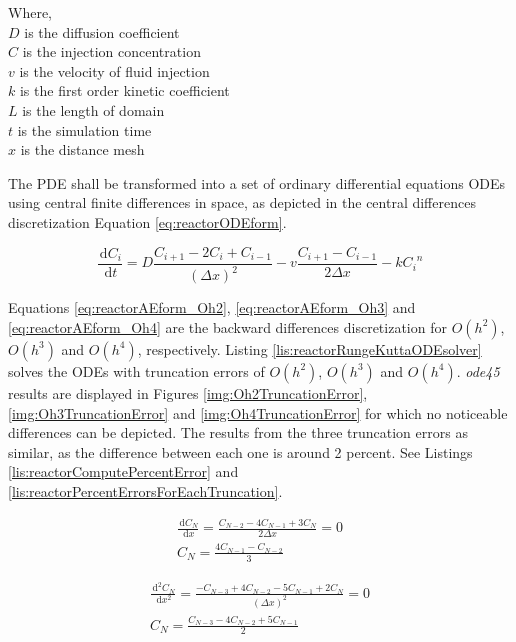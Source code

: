 \documentclass{article}
\newcommand{\ud}{\,\mathrm{d}}
\begin{document}
Where, \\
$D$ is the diffusion coefficient \\
$C$ is the injection concentration \\
$v$ is the velocity of fluid injection \\
$k$ is the first order kinetic coefficient \\
$L$ is the length of domain \\
$t$ is the simulation time \\
$x$ is the distance mesh

The PDE shall be transformed into a set of ordinary differential equations ODEs using central finite differences in space, as depicted in the central differences discretization Equation \ref{eq:reactorODEform}.

\begin{equation}
\frac{\ud C_i}{\ud t} = D \frac{C_{i+1} - 2 C_i + C_{i-1}}{\left( \Delta x \right)^2} - v \frac{C_{i+1} - C_{i-1}}{2 \Delta x} - k {C_i}^n
\label{eq:reactorODEform}
\end{equation}

Equations \ref{eq:reactorAEform_Oh2}, \ref{eq:reactorAEform_Oh3} and \ref{eq:reactorAEform_Oh4} are the backward differences discretization for $O(h^2)$, $O(h^3)$ and $O(h^4)$, respectively. Listing \ref{lis:reactorRungeKuttaODEsolver} solves the ODEs with truncation errors of $O(h^2)$, $O(h^3)$ and $O(h^4)$. \emph{ode45} results are displayed in Figures \ref{img:Oh2TruncationError}, \ref{img:Oh3TruncationError} and \ref{img:Oh4TruncationError} for which no noticeable differences can be depicted. The results from the three truncation errors as similar, as the difference between each one is around 2 percent. See Listings \ref{lis:reactorComputePercentError} and \ref{lis:reactorPercentErrorsForEachTruncation}.

\begin{equation}
\begin{aligned}
\frac{\ud C_N}{\ud x} = \frac{C_{N-2} - 4 C_{N-1} + 3 C_N}{2 \Delta x} = 0 \\
C_N = \frac{4 C_{N-1} - C_{N-2}}{3}
\end{aligned}
\label{eq:reactorAEform_Oh2}
\end{equation}

\begin{equation}
\begin{aligned}
\frac{\ud^2 C_N}{\ud x^2} = \frac{- C_{N-3} + 4 C_{N-2} - 5 C_{N-1} + 2 C_N}{\left( \Delta x \right)^2} = 0 \\
C_N = \frac{C_{N-3} - 4 C_{N-2} + 5 C_{N-1}}{2}
\end{aligned}
\label{eq:reactorAEform_Oh3}
\end{equation}
\end{document}
